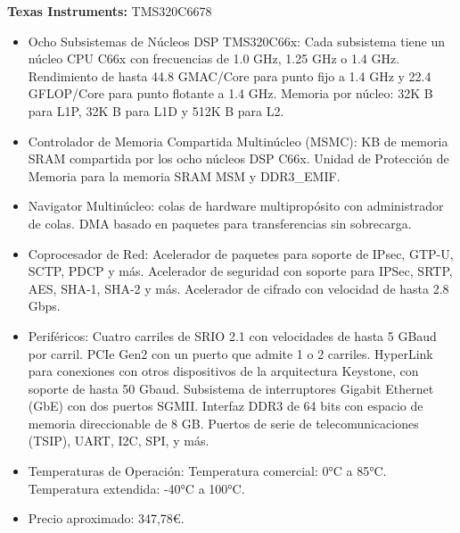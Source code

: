 \documentclass[11pt]{report}
\begin{document}
\textbf{Texas Instruments:} TMS320C6678
\begin{itemize}
      \item Ocho Subsistemas de Núcleos DSP TMS320C66x:
            \subitem Cada subsistema tiene un núcleo CPU C66x con frecuencias de 1.0 GHz, 1.25 GHz o 1.4 GHz.
            \subitem Rendimiento de hasta 44.8 GMAC/Core para punto fijo a 1.4 GHz y 22.4 GFLOP/Core para punto flotante a 1.4 GHz.
            \subitem Memoria por núcleo: 32K B para L1P, 32K B para L1D y 512K B para L2.

      \item Controlador de Memoria Compartida Multinúcleo (MSMC):
             KB de memoria SRAM compartida por los ocho núcleos DSP C66x.
            \subitem Unidad de Protección de Memoria para la memoria SRAM MSM y DDR3\_EMIF.

            \newpage

      \item Navigator Multinúcleo:
             colas de hardware multipropósito con administrador de colas.
            \subitem DMA basado en paquetes para transferencias sin sobrecarga.

      \item Coprocesador de Red:
            \subitem Acelerador de paquetes para soporte de IPsec, GTP-U, SCTP, PDCP y más.
            \subitem Acelerador de seguridad con soporte para IPSec, SRTP, AES, SHA-1, SHA-2 y más.
            \subitem Acelerador de cifrado con velocidad de hasta 2.8 Gbps.

      \item Periféricos:
            \subitem Cuatro carriles de SRIO 2.1 con velocidades de hasta 5 GBaud por carril.
            \subitem PCIe Gen2 con un puerto que admite 1 o 2 carriles.
            \subitem HyperLink para conexiones con otros dispositivos de la arquitectura Keystone, con soporte de hasta 50 Gbaud.
            \subitem Subsistema de interruptores Gigabit Ethernet (GbE) con dos puertos SGMII.
            \subitem Interfaz DDR3 de 64 bits con espacio de memoria direccionable de 8 GB.
            \subitem Puertos de serie de telecomunicaciones (TSIP), UART, I2C, SPI, y más.

      \item Temperaturas de Operación:
            \subitem Temperatura comercial: 0°C a 85°C.
            \subitem Temperatura extendida: -40°C a 100°C.

      \item Precio aproximado: 347,78\euro.
\end{itemize}
\end{document}
